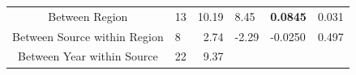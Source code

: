 \documentclass[fleqn,10pt,lineno]{wlpeerj} %
\theoremstyle{definition}
\theoremstyle{definition}
\theoremstyle{definition}
\theoremstyle{remark}
\begin{document}
\begin{longtable}[]{@{}clrllc@{}}
\begin{minipage}[b]{0.07\columnwidth}
\end{minipage}\tabularnewline
\midrule
\endhead
\begin{minipage}[t]{0.32\columnwidth}\centering\strut
Between Region\strut
\end{minipage} & \begin{minipage}[t]{0.06\columnwidth}\raggedright\strut
13\strut
\end{minipage} & \begin{minipage}[t]{0.07\columnwidth}\raggedleft\strut
10.19\strut
\end{minipage} & \begin{minipage}[t]{0.13\columnwidth}\raggedright\strut
8.45\strut
\end{minipage} & \begin{minipage}[t]{0.19\columnwidth}\raggedright\strut
\textbf{0.0845}\strut
\end{minipage} & \begin{minipage}[t]{0.07\columnwidth}\centering\strut
0.031\strut
\end{minipage}\tabularnewline
\begin{minipage}[t]{0.32\columnwidth}\centering\strut
Between Source within Region\strut
\end{minipage} & \begin{minipage}[t]{0.06\columnwidth}\raggedright\strut
8\strut
\end{minipage} & \begin{minipage}[t]{0.07\columnwidth}\raggedleft\strut
2.74\strut
\end{minipage} & \begin{minipage}[t]{0.13\columnwidth}\raggedright\strut
-2.29\strut
\end{minipage} & \begin{minipage}[t]{0.19\columnwidth}\raggedright\strut
-0.0250\strut
\end{minipage} & \begin{minipage}[t]{0.07\columnwidth}\centering\strut
0.497\strut
\end{minipage}\tabularnewline
\begin{minipage}[t]{0.32\columnwidth}\centering\strut
Between Year within Source\strut
\end{minipage} & \begin{minipage}[t]{0.06\columnwidth}\raggedright\strut
22\strut
\end{minipage} & \begin{minipage}[t]{0.07\columnwidth}\raggedleft\strut
9.37\strut
\end{minipage} & \begin{minipage}[t]{0.13\columnwidth}\raggedright\strut

\end{minipage}
\end{longtable}
\end{document}
